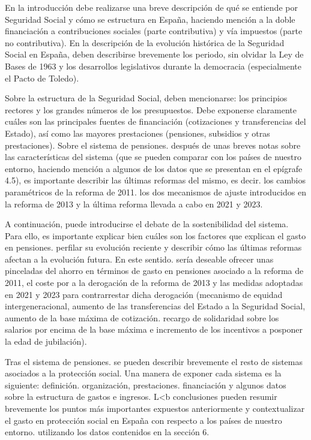 \documentclass[10pt,a4paper]{article}
\begin{document}
En la introducción debe realizarse una breve descripción de qué se entiende por Seguridad Social y cómo se estructura en España, haciendo mención a la doble financiación a contribuciones sociales (parte contributiva) y vía impuestos (parte no contributiva). En la descripción de la evolución histórica de la Seguridad Social en España, deben describirse brevemente los periodo, sin olvidar la Ley de Bases de 1963 y los desarrollos legislativos durante la democracia (especialmente el Pacto de Toledo).

Sobre la estructura de la Seguridad Social, deben mencionarse: los principios rectores y los grandes números de los presupuestos. Debe exponerse claramente cuáles son las principales fuentes de financiación (cotizaciones y transferencias del Estado), así como las mayores prestaciones (pensiones, subsidios y otras prestaciones). Sobre el sistema de pensiones. después de unas breves notas sobre las características del sistema (que se pueden comparar con los países de nuestro entorno, haciendo mención a algunos de los datos que se presentan en el epígrafe 4.5), es importante describir las últimas reformas del mismo, es decir. los cambios paramétricos de la reforma de 2011. los dos mecanismos de ajuste introducidos en la reforma de 2013 y la última reforma llevada a cabo en 2021 y 2023.

A continuación, puede introducirse el debate de la sostenibilidad del sistema. Para ello, es importante explicar bien cuáles son los factores que explican el gasto en pensiones. perfilar su evolución reciente y describir cómo las últimas reformas afectan a la evolución futura. En este sentido. sería deseable ofrecer unas pinceladas del ahorro en términos de gasto en pensiones asociado a la reforma de 2011, el coste por a la derogación de la reforma de 2013 y las medidas adoptadas en 2021 y 2023 para contrarrestar dicha derogación (mecanismo de equidad intergeneracional, aumento de las transferencias del Estado a la Seguridad Social, aumento de la base máxima de cotización. recargo de solidaridad sobre los salarios por encima de la base máxima e incremento de los incentivos a posponer la edad de jubilación).

Tras el sistema de pensiones. se pueden describir brevemente el resto de sistemas asociados a la protección social. Una manera de exponer cada sistema es la siguiente: definición. organización, prestaciones. financiación y algunos datos sobre la estructura de gastos e ingresos. L<b conclusiones pueden resumir brevemente los puntos más importantes expuestos anteriormente y contextualizar el gasto en protección social en España con respecto a los países de nuestro entorno. utilizando los datos contenidos en la sección 6.
\end{document}
